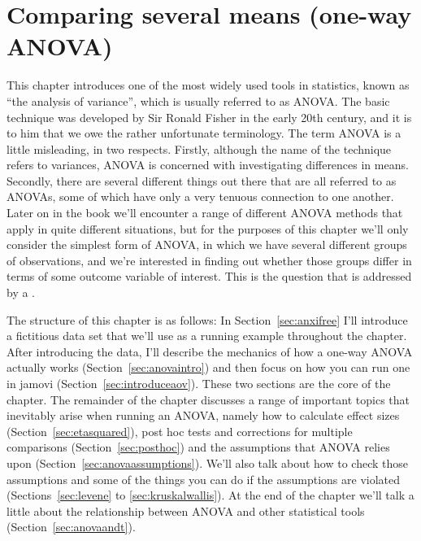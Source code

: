 

\chapter{Comparing several means (one-way ANOVA)\label{ch:anova}}

This chapter introduces one of the most widely used tools in statistics, known as ``the analysis of variance'', which is usually referred to as ANOVA. The basic technique was developed by Sir Ronald Fisher in the early 20th century, and it is to him that we owe the rather unfortunate terminology. The term ANOVA is a little misleading, in two respects. Firstly, although the name of the technique refers to variances, ANOVA is concerned with investigating differences in means. Secondly, there are several different things out there that are all referred to as ANOVAs, some of which have only a very tenuous connection to one another. Later on in the book we'll encounter a range of different ANOVA methods that apply in quite different situations, but for the purposes of this chapter we'll only consider the simplest form of ANOVA, in which we have several different groups of observations, and we're interested in finding out whether those groups differ in terms of some outcome variable of interest. This is the question that is addressed by a . 

The structure of this chapter is as follows: In Section~\ref{sec:anxifree} I'll introduce a fictitious data set that we'll use as a running example throughout the chapter. After introducing the data, I'll describe the mechanics of how a one-way ANOVA actually works (Section~\ref{sec:anovaintro}) and then focus on how you can run one in jamovi (Section~\ref{sec:introduceaov}). These two sections are the core of the chapter. The remainder of the chapter discusses a range of important topics that inevitably arise when running an ANOVA, namely how to calculate effect sizes (Section~\ref{sec:etasquared}), post hoc tests and corrections for multiple comparisons (Section~\ref{sec:posthoc}) and the assumptions that ANOVA relies upon (Section~\ref{sec:anovaassumptions}). We'll also talk about how to check those assumptions and some of the things you can do if the assumptions are violated (Sections~\ref{sec:levene} to \ref{sec:kruskalwallis}). At the end of the chapter we'll talk a little about the relationship between ANOVA and other statistical tools (Section~\ref{sec:anovaandt}). 



